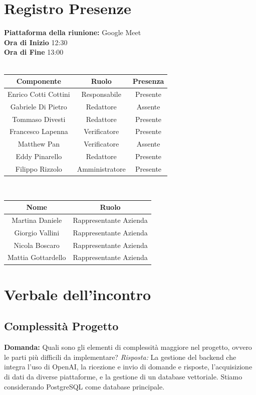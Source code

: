 \documentclass{article}
\begin{document}
\section{Registro Presenze}
\textbf{Piattaforma della riunione:} Google Meet \\
\textbf{Ora di Inizio} 12:30\\
\textbf{Ora di Fine} 13:00\\
\\
\begin{tabular}{|c|c|c|}
    \hline
    \textbf{Componente} & \textbf{Ruolo} & \textbf{Presenza}\\
    \hline
    Enrico Cotti Cottini & Responsabile & Presente \\ 
    \hline
    Gabriele Di Pietro & Redattore & Assente \\ 
    \hline
    Tommaso Divesti & Redattore & Presente \\ 
    \hline 
    Francesco Lapenna & Verificatore & Presente \\ 
    \hline
    Matthew Pan & Verificatore & Assente \\ 
    \hline 
    Eddy Pinarello & Redattore & Presente \\ 
    \hline 
    Filippo Rizzolo & Amministratore & Presente \\ 
    \hline 
\end{tabular}
\\
\newline
\newline
\begin{tabular}{|c|c|}
    \hline
    \textbf{Nome} & \textbf{Ruolo}\\
    \hline
    Martina Daniele & Rappresentante Azienda \\
    \hline
    Giorgio Vallini & Rappresentante Azienda \\
    \hline
    Nicola Boscaro & Rappresentante Azienda \\
    \hline
    Mattia Gottardello & Rappresentante Azienda \\
    \hline
\end{tabular}
\newpage

\section{Verbale dell'incontro}

\subsection{Complessità Progetto} \textbf{Domanda:} Quali sono gli elementi di complessità maggiore nel progetto, ovvero le parti più difficili da implementare?
\newline
\textit{Risposta:} La gestione del backend che integra l'uso di OpenAI, la ricezione e invio di domande e risposte, l'acquisizione di dati da diverse piattaforme, e la gestione di un database vettoriale. Stiamo considerando PostgreSQL come database principale.
\end{document}
